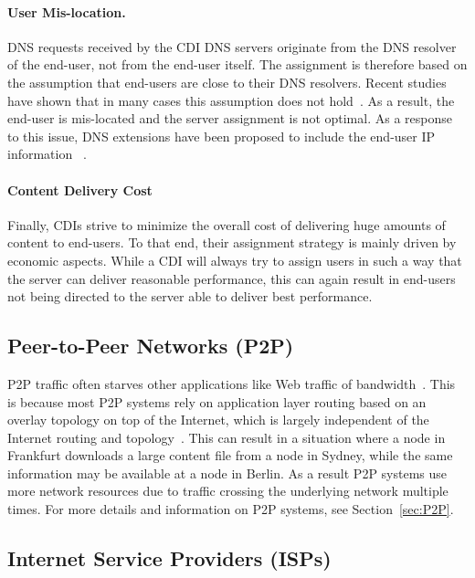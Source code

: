\paragraph{User Mis-location.} DNS requests received by the CDI DNS servers
originate from the DNS resolver of the end-user, not from the end-user itself.
The assignment is therefore based on the assumption that end-users are close to
their DNS resolvers. Recent studies have shown that in many cases this
assumption does not hold~\cite {Precise:Mao2002,DNS-IMC-2010}. As a result, the
end-user is mis-located and the server assignment is not optimal. As a response
to this issue, DNS extensions have been proposed to include the end-user IP
information~ \cite{DNS-extension-IP-client}.  \paragraph{Content Delivery Cost}
Finally, CDIs strive to minimize the overall cost of delivering huge amounts of
content to end-users. To that end, their assignment strategy is mainly driven
by economic aspects.  While a CDI will always try to assign users in such a way
that the server can deliver reasonable performance, this can again result in
end-users not being directed to the server able to deliver best performance.

\subsection{Peer-to-Peer Networks (P2P)}\label{sec:P2P-and-Challenges}

P2P traffic often starves other applications like Web traffic of
bandwidth~\cite{swxzz-hptp-07}.  This is because most P2P systems rely on
application layer routing based on an overlay topology on top of the Internet,
which is largely independent of the Internet routing and
topology~\cite{abfw-mendg-04}. This can result in a situation where a node in
Frankfurt downloads a large content file from a node in Sydney, while the same
information may be available at a node in Berlin.  As a result P2P systems use
more network resources due to traffic crossing the underlying network multiple
times. For more details and information on P2P systems, see
Section~\ref{sec:P2P}.


\subsection{Internet Service Providers (ISPs)}\label{sec:ISPs-and-Challenges}

